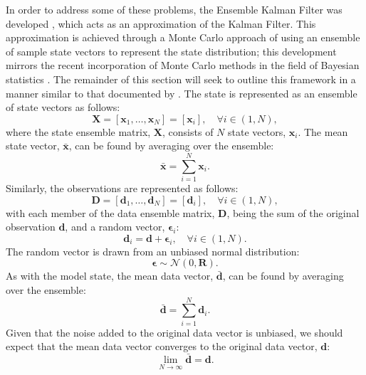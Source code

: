 In order to address some of these problems, the Ensemble Kalman Filter was
developed \citep{evensen2003ensemble, evensen2009ensemble}, which acts as an
approximation of the Kalman Filter.
This approximation is achieved through a Monte Carlo approach of using an
ensemble of sample state vectors to represent the state distribution; this
development mirrors the recent incorporation of Monte Carlo methods in the field
of Bayesian statistics \citep{wikle2007bayesian}.
The remainder of this section will seek to outline this framework in a manner
similar to that documented by \citet{mandel2009brief}.
The state is represented as an ensemble of state vectors as follows:
\begin{equation}
    \mathbf{X} = \left[ \mathbf{x}_1, \ldots, \mathbf{x}_N \right]
               = \left[ \mathbf{x}_i \right], \quad \forall i \in (1, N),
\end{equation}
where the state ensemble matrix, $\mathbf{X}$, consists of $N$ state vectors,
$\mathbf{x}_i$.
The mean state vector, $\bar{\mathbf{x}}$, can be found by averaging over the
ensemble:
\begin{equation}
    \bar{\mathbf{x}} = \sum_{i = 1}^{N} \mathbf{x}_i.
\end{equation}
Similarly, the observations are represented as follows:
\begin{equation}
    \mathbf{D} = \left[ \mathbf{d}_1, \ldots, \mathbf{d}_N \right]
               = \left[ \mathbf{d}_i \right], \quad \forall i \in (1, N),
\end{equation}
with each member of the data ensemble matrix, $\mathbf{D}$, being the sum of the
original observation $\mathbf{d}$, and a random vector, $\mathbf{\epsilon}_i$:
\begin{equation}
    \mathbf{d}_i = \mathbf{d} + \mathbf{\epsilon}_i, \quad
                   \forall i \in (1, N).
\end{equation}
The random vector is drawn from an unbiased normal distribution:
\begin{equation*}
    \mathbf{\epsilon} \sim \mathcal{N} (0, \mathbf{R}).
\end{equation*}
As with the model state, the mean data vector, $\bar{\mathbf{d}}$, can be found
by averaging over the ensemble:
\begin{equation}
    \bar{\mathbf{d}} = \sum_{i = 1}^{N} \mathbf{d}_i.
\end{equation}
Given that the noise added to the original data vector is unbiased, we should
expect that the mean data vector converges to the original data vector,
$\mathbf{d}$:
\begin{equation*}
    \lim_{N \to \infty} \bar{\mathbf{d}} = \mathbf{d}.
\end{equation*}


